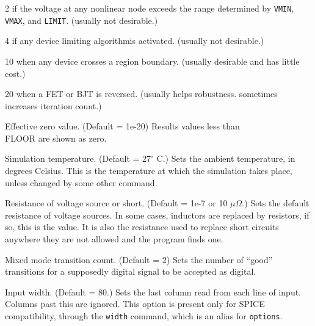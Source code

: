 \begin{description}
\begin{description}
\item{2} if the voltage at any nonlinear node exceeds the range
determined by {\tt VMIN}, {\tt VMAX}, and {\tt LIMIT}.  (usually
not desirable.)

\item{4} if any device limiting algorithmis activated.  (usually
not desirable.)

\item{10} when any device crosses a region boundary.  (usually
desirable and has little cost.)

\item{20} when a FET or BJT is reversed.  (usually helps robustness.
sometimes increases iteration count.)

\end{description}
	
\item[{\tt FLOOR} = {\it x}] Effective zero value.  (Default =
1e-20) Results values less than {\\ FLOOR} are shown as zero.
	
\item[{\tt TEMPAMB} = {\it x}] Simulation temperature.
(Default = 27$^{\circ}$ C.)  Sets the ambient temperature, in
degrees Celsius.  This is the temperature at which the
simulation takes place, unless changed by some other command.

\item[{\tt Short} = {\it x}] Resistance of voltage source or
short.  (Default = 1e-7 or 10 $\mu\Omega$.)  Sets the default
resistance of voltage sources.  In some cases, inductors are
replaced by resistors, if so, this is the value.  It is also
the resistance used to replace short circuits anywhere they are
not allowed and the program finds one.

\item[{\tt TRansits} = {\it x}] Mixed mode transition count. (Default = 2)
Sets the number of ``good'' transitions for a supposedly digital signal
to be accepted as digital.

\item[{\tt IN} = {\it x}] Input width.  (Default = 80.)
Sets the last column read from each line of input.  Columns
past this are ignored.  This option is present only for SPICE
compatibility, through the {\tt width} command, which is an
alias for {\tt options}.


\end{description}
